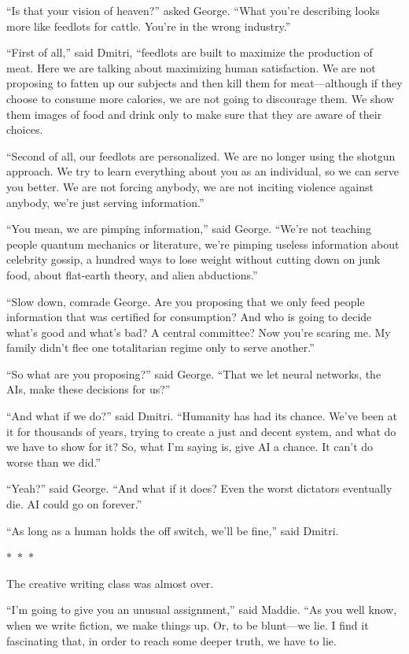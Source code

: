 \documentclass{memoir}
\newcommand{\starbreak}{%
\begin{center}
  $\ast$~$\ast$~$\ast$
\end{center}
}
\begin{document}
``Is that your vision of heaven?'' asked George. ``What you're describing looks more like feedlots for cattle. You're in the wrong industry.''

``First of all,'' said Dmitri, ``feedlots are built to maximize the production of meat. Here we are talking about maximizing human satisfaction. We are not proposing to fatten up our subjects and then kill them for meat---although if they choose to consume more calories, we are not going to discourage them. We show them images of food and drink only to make sure that they are aware of their choices. 

``Second of all, our feedlots are personalized. We are no longer using the shotgun approach. We try to learn everything about you as an individual, so we can serve you better. We are not forcing anybody, we are not inciting violence against anybody, we're just serving information.''

``You mean, we are pimping information,'' said George. ``We're not teaching people quantum mechanics or literature, we're pimping useless information about celebrity gossip, a hundred ways to lose weight without cutting down on junk food, about flat-earth theory, and alien abductions.''

``Slow down, comrade George. Are you proposing that we only feed people information that was certified for consumption? And who is going to decide what's good and what's bad? A central committee? Now you're scaring me. My family didn't flee one totalitarian regime only to serve another.''

``So what are you proposing?'' said George. ``That we let neural networks, the AIs, make these decisions for us?''

``And what if we do?'' said Dmitri. ``Humanity has had its chance. We've been at it for thousands of years, trying to create a just and decent system, and what do we have to show for it? So, what I'm saying is, give AI a chance. It can't do worse than we did.''

``Yeah?'' said George. ``And what if it does? Even the worst dictators eventually die. AI could go on forever.''

``As long as a human holds the off switch, we'll be fine,'' said Dmitri.

\starbreak

The creative writing class was almost over.

``I'm going to give you an unusual assignment,'' said Maddie. ``As you well know, when we write fiction, we make things up. Or, to be blunt---we lie. I find it fascinating that, in order to reach some deeper truth, we have to lie. 
\end{document}
